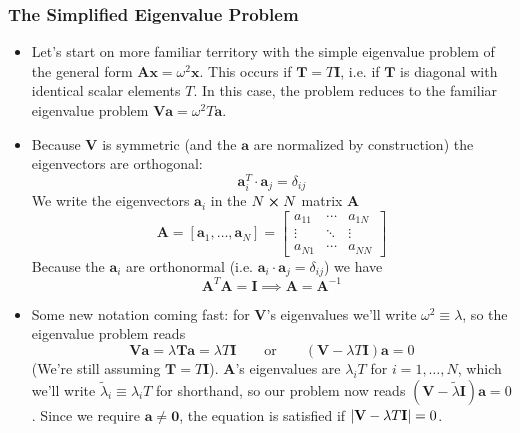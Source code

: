 \documentclass[11pt, a4paper]{article}
\newcommand{\eqtext}[1]{\qquad \text{#1} \qquad}
\newcommand{\mat}[1]{\mathbf{#1}} %
\begin{document}
\subsubsection{The Simplified Eigenvalue Problem}
\begin{itemize}
	\item Let's start on more familiar territory with the simple eigenvalue problem of the general form $  \mat{A} \bm{x} = \omega^{2} \bm{x}  $. This occurs if $ \mat{T} = T \mat{I} $, i.e. if $ \mat{T} $ is diagonal with identical scalar elements $ T $. In this case, the problem reduces to the familiar eigenvalue problem $ \mat{V} \bm{a} = \omega^{2} T \bm{a} $.
	
	\item Because $ \bm{V} $ is symmetric (and the $ \mat{a} $ are normalized by construction) the eigenvectors are orthogonal:
	\begin{equation*}
		\bm{a}_{i}^{T} \cdot \bm{a}_{j} = \delta_{ij}
	\end{equation*}
	We write the eigenvectors $ \bm{a}_{i} $ in the $ N \cross N $ matrix $ \mat{A} $ 
	\begin{equation*}
		\mat{A} = [\bm{a}_{1}, \ldots, \bm{a}_{N}] =
		\begin{bmatrix}
			a_{11} & \cdots & a_{1N}\\
			\vdots & \ddots & \vdots\\
			a_{N1} & \cdots & a_{NN}
		\end{bmatrix}
	\end{equation*}
	Because the $ \bm{a}_{i} $ are orthonormal (i.e. $ \bm{a}_{i} \cdot \bm{a}_{j} = \delta_{ij} $) we have
	\begin{equation*}
		\mat{A}^{T} \mat{A} = \mat{I} \implies \mat{A} = \mat{A}^{-1}
	\end{equation*}
	
	\item Some new notation coming fast: for $ \mat{V} $'s eigenvalues we'll write $ \omega^{2} \equiv \lambda $, so the eigenvalue problem reads 
	\begin{equation*}
		\mat{V} \bm{a} = \lambda \mat{T} \bm{a} = \lambda T \mat{I}
		\eqtext{or} (\mat{V} - \lambda T \mat{I}) \bm{a} = 0
	\end{equation*}
	(We're still assuming $ \mat{T} = T \mat{I} $). $ \mat{A} $'s eigenvalues are $ \lambda_{i}T $ for $ i = 1, \ldots, N $, which we'll write $ \tilde{\lambda}_{i} \equiv \lambda_{i}T $ for shorthand, so our problem now reads $ (\mat{V} - \tilde{\lambda}\mat{I}) \bm{a} = 0 $. 	Since we require $ \bm{a} \neq \bm{0} $, the equation is satisfied if $ \abs{\mat{V} - \lambda T \mat{I}} = 0 $.
	

\end{itemize}
\end{document}
